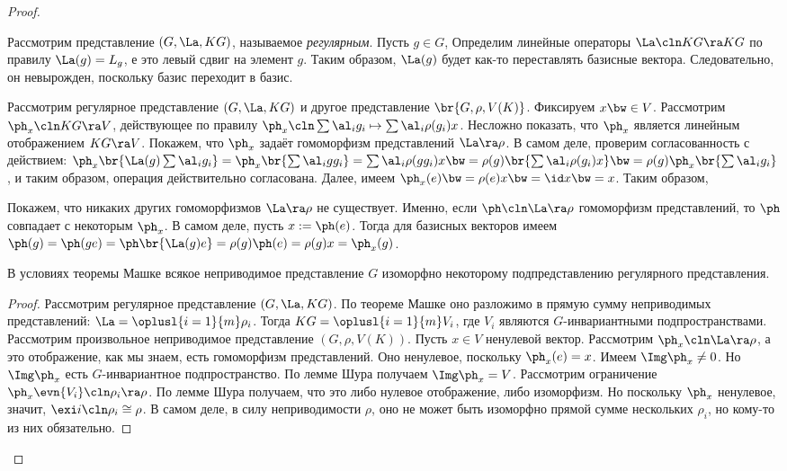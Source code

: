 \documentclass[a4paper]{article}
\begin{document}
\begin{proof}
\begin{df}
Рассмотрим представление $(G, \La, KG)$, называемое \emph{регулярным}.  Пусть $g \in G$, Определим линейные
операторы $\La\cln KG \ra KG$ по правилу $\La(g) = L_g$, е это левый сдвиг на элемент $g$. Таким образом,
$\La(g)$ будет как-то переставлять базисные вектора. Следовательно, он невырожден, поскольку базис переходит
в базис.
\end{df}

Рассмотрим регулярное представление $(G, \La, KG)$ и другое представление  $\br{G, \rho, V(K)}$. Фиксируем
$x \bw\in V$. Рассмотрим $\ph_x\cln KG \ra V$, действующее по правилу $\ph_x \cln \sum \al_ig_i \mapsto \sum \al_i
\rho(g_i)x$. Несложно показать, что $\ph_x$ является линейным отображением $KG \ra V$. Покажем, что $\ph_x$
задаёт гомоморфизм представлений $\La \ra \rho$. В самом деле, проверим согласованность с действием:
$\ph_x\br{\La(g)\sum \al_i g_i} = \ph_x \br{\sum \al_i gg_i}= \sum \al_i \rho(gg_i)x \bw= \rho(g)\br{\sum \al_i
\rho(g_i)x} \bw= \rho(g) \ph_x\br{\sum \al_ig_i}$, и таким образом, операция действительно согласована. Далее,
имеем $\ph_x(e)\bw=\rho(e)x\bw= \id x \bw= x$. Таким образом,

Покажем, что никаких других гомоморфизмов $\La \ra \rho$ не существует.  Именно, если $\ph\cln \La \ra \rho$
гомоморфизм представлений, то $\ph$ совпадает с некоторым $\ph_x$. В самом деле, пусть $x := \ph(e)$. Тогда
для базисных векторов имеем $\ph(g)=\ph(ge)=\ph\br{\La(g)e}=\rho(g)\ph(e)=\rho(g)x=\ph_x(g)$.

\begin{theorem}
В условиях теоремы Машке всякое неприводимое представление $G$ изоморфно
некоторому подпредставлению регулярного представления.
\end{theorem}
\begin{proof}
Рассмотрим регулярное представление $(G, \La, KG)$. По теореме Машке оно  разложимо в прямую сумму
неприводимых представлений: $\La = \oplusl{i=1}{m}\rho_i$. Тогда $KG = \oplusl{i=1}{m}V_i$, где $V_i$
являются $G$-инвариантными подпространствами. Рассмотрим произвольное неприводимое представление $(G, \rho,
V(K))$. Пусть $x \in V$ ненулевой вектор. Рассмотрим $\ph_x\cln \La \ra \rho$, а это отображение, как мы
знаем, есть гомоморфизм представлений. Оно ненулевое, поскольку $\ph_x(e)=x$. Имеем $\Img \ph_x \neq 0$. Но
$\Img \ph_x$ есть $G$-инвариантное подпространство. По лемме Шура получаем $\Img \ph_x = V$. Рассмотрим
ограничение $\ph_x\evn{V_i}\cln \rho_i \ra \rho$. По лемме Шура получаем, что это либо нулевое отображение,
либо изоморфизм. Но поскольку $\ph_x$ ненулевое, значит, $\exi i\cln \rho_i \cong \rho$. В самом деле, в силу
неприводимости $\rho$, оно не может быть изоморфно прямой сумме нескольких $\rho_i$, но кому-то из них
обязательно.
\end{proof}


\end{proof}
\end{document}
